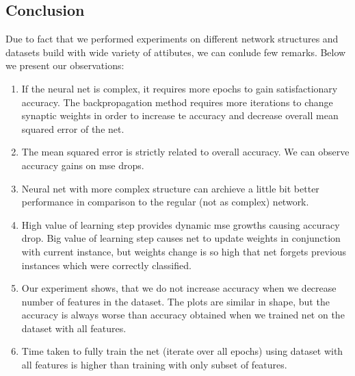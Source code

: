 \documentclass[12pt,a4paper]{article}
\begin{document}
\subsection{Conclusion}

Due to fact that we performed experiments on different network structures and datasets build with wide variety of attibutes, we can conlude few remarks. Below we present our observations:
\begin{enumerate}
\item If the neural net is complex, it requires more epochs to gain satisfactionary accuracy. The backpropagation method requires more iterations to change synaptic weights in order to increase te accuracy and decrease overall mean squared error of the net.
\item The mean squared error is strictly related to overall accuracy. We can observe accuracy gains on mse drops.
\item Neural net with more complex structure can archieve a little bit better performance in comparison to the regular (not as complex) network.
\item High value of learning step provides dynamic mse growths causing accuracy drop. Big value of learning step causes net to update weights in conjunction with current instance, but weights change is so high that net forgets previous instances which were correctly classified.
\item Our experiment shows, that we do not increase accuracy when we decrease number of features in the dataset. The plots are similar in shape, but the accuracy is always worse than accuracy obtained when we trained net on the dataset with all features.
\item Time taken to fully train the net (iterate over all epochs) using dataset with all features is higher than training with only subset of features.
\end{enumerate}
 
\end{document}
